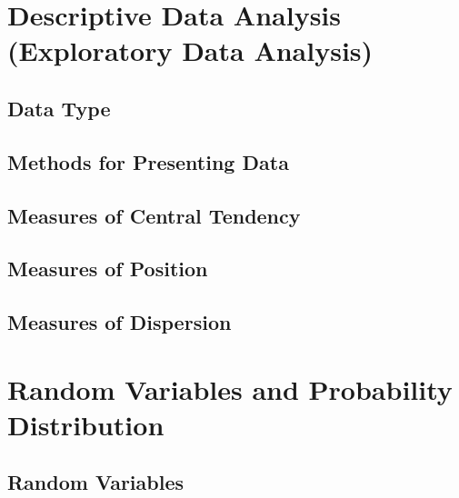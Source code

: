 \documentclass[
	11pt, %
	handout,
]{beamer}
\begin{document}


\section{Descriptive Data Analysis (Exploratory Data Analysis)}


\subsection{Data Type}


\subsection{Methods for Presenting Data}


\subsection{Measures of Central Tendency}


\subsection{Measures of Position}


\subsection{Measures of Dispersion}



\section{Random Variables and Probability Distribution}


\subsection{Random Variables}
\end{document}
